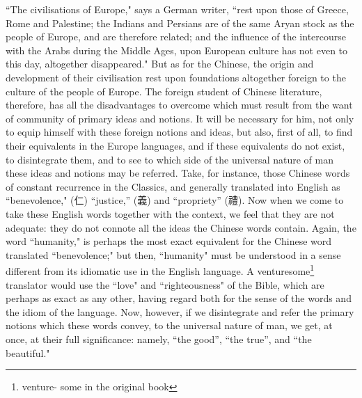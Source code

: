 ``The civilisations of Europe," says a German writer, ``rest upon those of Greece, Rome and Palestine; the Indians and Persians are of the same Aryan stock as the people of Europe, and are therefore related; and the influence of the intercourse with the Arabs during the Middle Ages, upon European culture has not even to this day, altogether disappeared."
But as for the Chinese, the origin and development of their civilisation rest upon foundations altogether foreign to the culture of the people of Europe.
The foreign student of Chinese literature, therefore, has all the disadvantages to overcome which must result from the want of community of primary ideas and notions.
It will be necessary for him, not only to equip himself with these foreign notions and ideas, but also, first of all, to find their equivalents in the Europe languages, and if these equivalents do not exist, to disintegrate them, and to see to which side of the universal nature of man these ideas and notions may be referred.
Take, for instance, those Chinese words of constant recurrence in the Classics, and generally translated into English as ``benevolence," (仁) ``justice,'' (義) and ``propriety'' (禮).
Now when we come to take these English words together with the context, we feel that they are not adequate: they do not connote all the ideas the Chinese words contain.
Again, the word ``humanity," is perhaps the most exact equivalent for the Chinese word translated ``benevolence;" but then, ``humanity" must be understood in a sense different from its idiomatic use in the English language.
A venturesome\footnote{venture- some in the original book} translator would use the ``love" and ``righteousness" of the Bible, which are perhaps as exact as any other, having regard both for the sense of the words and the idiom of the language.
Now, however, if we disintegrate and refer the primary notions which these words convey, to the universal nature of man, we get, at once, at their full significance: namely, ``the good'', ``the true'', and ``the beautiful."

